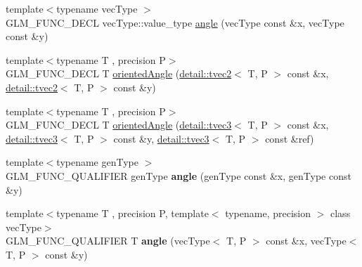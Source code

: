\begin{DoxyCompactItemize}
\item 
{\footnotesize template$<$typename vec\-Type $>$ }\\G\-L\-M\-\_\-\-F\-U\-N\-C\-\_\-\-D\-E\-C\-L vec\-Type\-::value\-\_\-type \hyperlink{group__gtx__vector__angle_gab8691008a2536b681b711211816c14f7}{angle} (vec\-Type const \&x, vec\-Type const \&y)
\item 
{\footnotesize template$<$typename T , precision P$>$ }\\G\-L\-M\-\_\-\-F\-U\-N\-C\-\_\-\-D\-E\-C\-L T \hyperlink{group__gtx__vector__angle_ga6f9cbae1b02b49ad92a1d0070649f038}{oriented\-Angle} (\hyperlink{structglm_1_1detail_1_1tvec2}{detail\-::tvec2}$<$ T, P $>$ const \&x, \hyperlink{structglm_1_1detail_1_1tvec2}{detail\-::tvec2}$<$ T, P $>$ const \&y)
\item 
{\footnotesize template$<$typename T , precision P$>$ }\\G\-L\-M\-\_\-\-F\-U\-N\-C\-\_\-\-D\-E\-C\-L T \hyperlink{group__gtx__vector__angle_ga2aefc221dd5ed9fdacc17c28eea76775}{oriented\-Angle} (\hyperlink{structglm_1_1detail_1_1tvec3}{detail\-::tvec3}$<$ T, P $>$ const \&x, \hyperlink{structglm_1_1detail_1_1tvec3}{detail\-::tvec3}$<$ T, P $>$ const \&y, \hyperlink{structglm_1_1detail_1_1tvec3}{detail\-::tvec3}$<$ T, P $>$ const \&ref)
\item 
\hypertarget{namespaceglm_a0634619b62db66fe6a4bd04da1feabea}{{\footnotesize template$<$typename gen\-Type $>$ }\\G\-L\-M\-\_\-\-F\-U\-N\-C\-\_\-\-Q\-U\-A\-L\-I\-F\-I\-E\-R gen\-Type {\bfseries angle} (gen\-Type const \&x, gen\-Type const \&y)}\label{namespaceglm_a0634619b62db66fe6a4bd04da1feabea}

\item 
\hypertarget{namespaceglm_a8501bc310fa98bb40bec1b3c285183f1}{{\footnotesize template$<$typename T , precision P, template$<$ typename, precision $>$ class vec\-Type$>$ }\\G\-L\-M\-\_\-\-F\-U\-N\-C\-\_\-\-Q\-U\-A\-L\-I\-F\-I\-E\-R T {\bfseries angle} (vec\-Type$<$ T, P $>$ const \&x, vec\-Type$<$ T, P $>$ const \&y)}\label{namespaceglm_a8501bc310fa98bb40bec1b3c285183f1}


\end{DoxyCompactItemize}
